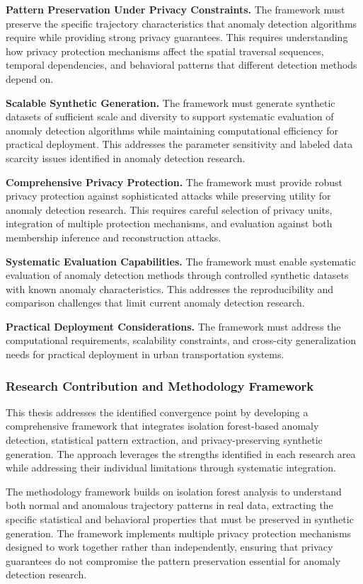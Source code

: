\documentclass[runningheads]{llncs}
\begin{document}
\textbf{Pattern Preservation Under Privacy Constraints.} The framework must preserve the specific trajectory characteristics that anomaly detection algorithms require while providing strong privacy guarantees. This requires understanding how privacy protection mechanisms affect the spatial traversal sequences, temporal dependencies, and behavioral patterns that different detection methods depend on.

\textbf{Scalable Synthetic Generation.} The framework must generate synthetic datasets of sufficient scale and diversity to support systematic evaluation of anomaly detection algorithms while maintaining computational efficiency for practical deployment. This addresses the parameter sensitivity and labeled data scarcity issues identified in anomaly detection research.

\textbf{Comprehensive Privacy Protection.} The framework must provide robust privacy protection against sophisticated attacks while preserving utility for anomaly detection research. This requires careful selection of privacy units, integration of multiple protection mechanisms, and evaluation against both membership inference and reconstruction attacks.

\textbf{Systematic Evaluation Capabilities.} The framework must enable systematic evaluation of anomaly detection methods through controlled synthetic datasets with known anomaly characteristics. This addresses the reproducibility and comparison challenges that limit current anomaly detection research.

\textbf{Practical Deployment Considerations.} The framework must address the computational requirements, scalability constraints, and cross-city generalization needs for practical deployment in urban transportation systems.

\subsubsection{Research Contribution and Methodology Framework}

This thesis addresses the identified convergence point by developing a comprehensive framework that integrates isolation forest-based anomaly detection, statistical pattern extraction, and privacy-preserving synthetic generation. The approach leverages the strengths identified in each research area while addressing their individual limitations through systematic integration.

The methodology framework builds on isolation forest analysis to understand both normal and anomalous trajectory patterns in real data, extracting the specific statistical and behavioral properties that must be preserved in synthetic generation. The framework implements multiple privacy protection mechanisms designed to work together rather than independently, ensuring that privacy guarantees do not compromise the pattern preservation essential for anomaly detection research.
\end{document}
